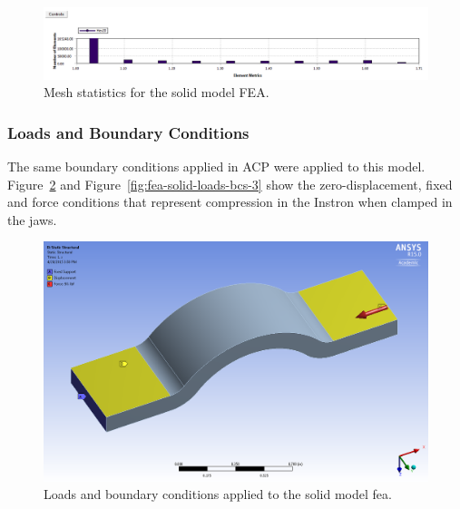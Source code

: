 \begin{figure}[htp]
\centering
\includegraphics[width=1\textwidth]{./figures/fea/fea-solid-mesh-metrics}
\caption{Mesh statistics for the solid model FEA.}
\label{fig:fea-solid-mesh-metrics}
\end{figure}

\clearpage

\subsubsection{Loads and Boundary Conditions}

\indent

The same boundary conditions applied in ACP were applied to this model. Figure~\ref{fig:fea-solid-loads-bcs} and Figure~\ref{fig:fea-solid-loads-bcs-3} show the zero-displacement, fixed and force conditions that represent compression in the Instron when clamped in the jaws.\\

\begin{figure}[htp]
\centering
\includegraphics[width=1\textwidth]{./figures/fea/fea-solid-loads-bcs}
\caption{Loads and boundary conditions applied to the solid model fea.}
\label{fig:fea-solid-loads-bcs}
\end{figure}

